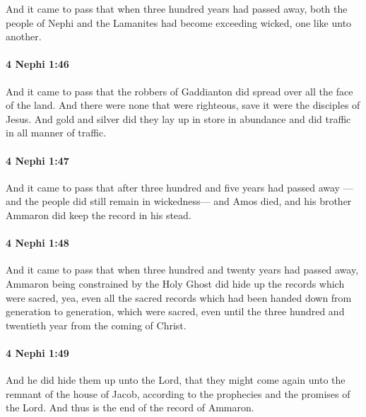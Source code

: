 			And it came to pass that when three hundred years had passed away,
			both the people of Nephi and the Lamanites had become exceeding wicked,
			one like unto another.

		\paragraph{4 Nephi 1:46} %
			\label{4NEPHI-1-46}

			And it came to pass that
			the robbers of Gaddianton did spread over all the face of the land.
			And there were none that were righteous,
			save it were the disciples of Jesus.
			And gold and silver did they lay up in store in abundance
			and did traffic in all manner of traffic.

		\paragraph{4 Nephi 1:47} %
			\label{4NEPHI-1-47}

			And it came to pass that after three hundred and five years had passed away
			—and the people did still remain in wickedness—
			and Amos died, and his brother Ammaron did keep the record in his stead.

		\paragraph{4 Nephi 1:48} %
			\label{4NEPHI-1-48}

			And it came to pass that when three hundred and twenty years had passed away,
			Ammaron being constrained by the Holy Ghost
			did hide up the records which were sacred,
			yea, even all the sacred records which had been handed down
			from generation to generation, which were sacred,
			even until the three hundred and twentieth year from the coming of Christ.

		\paragraph{4 Nephi 1:49} %
			\label{4NEPHI-1-49}

			And he did hide them up unto the Lord,
			that they might come again unto the remnant of the house of Jacob,
			according to the prophecies and the promises of the Lord.
			And thus is the end of the record of Ammaron.